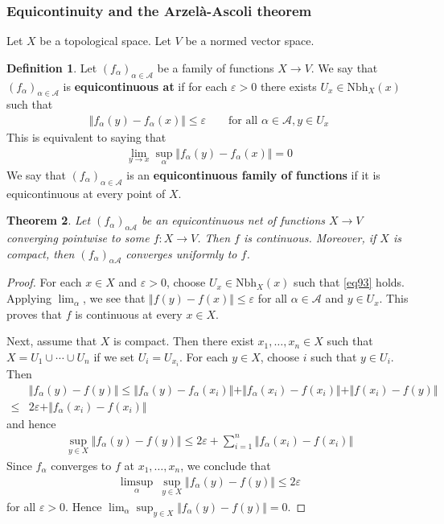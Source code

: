 \documentclass[12pt,b5paper,notitlepage]{article}
\theoremstyle{definition}
\newtheorem{df}{Definition}[section]
\theoremstyle{plain}
\newtheorem{thm}[df]{Theorem}
\newcommand{\scr}{\mathscr}
\newcommand{\Nbh}{\mathrm{Nbh}}
\newcommand{\eps}{\varepsilon}
\numberwithin{equation}{section}
\begin{document}
\subsubsection{Equicontinuity and the Arzel\`a-Ascoli theorem}

Let $X$ be a topological space. Let $V$ be a normed vector space.

\begin{df}
Let $(f_\alpha)_{\alpha\in\scr A}$ be a family of functions $X\rightarrow V$. We say that $(f_\alpha)_{\alpha\in\scr A}$ is \textbf{equicontinuous at }  if for each $\eps>0$ there exists $U_x\in\Nbh_X(x)$ such that
\begin{align}\label{eq93}
\Vert f_\alpha(y)-f_\alpha(x)\Vert\leq\eps\qquad\text{for all }\alpha\in\scr A,y\in U_x
\end{align}
This is equivalent to saying that
\begin{align*}
\lim_{y\rightarrow x}\sup_\alpha\Vert f_\alpha(y)-f_\alpha(x)\Vert=0
\end{align*}
We say that $(f_\alpha)_{\alpha\in\scr A}$ is an \textbf{equicontinuous family of functions} if it is equicontinuous at every point of $X$.
\end{df}


\begin{thm}\label{lb179}
Let $(f_\alpha)_{\alpha\scr A}$ be an equicontinuous net of functions $X\rightarrow V$ converging pointwise to some $f:X\rightarrow V$. Then $f$ is continuous. Moreover, if $X$ is compact, then $(f_\alpha)_{\alpha\scr A}$ converges uniformly to $f$.
\end{thm}

\begin{proof}
For each $x\in X$ and $\eps>0$, choose  $U_x\in\Nbh_X(x)$ such that \eqref{eq93} holds. Applying $\lim_\alpha$, we see that $\Vert f(y)-f(x)\Vert\leq\eps$ for all $\alpha\in\scr A$ and $y\in U_x$. This proves that $f$ is continuous at every $x\in X$.

Next, assume that $X$ is compact. Then there exist $x_1,\dots,x_n\in X$ such that $X=U_1\cup\cdots\cup U_n$ if we set $U_i=U_{x_i}$. For each $y\in X$, choose $i$ such that $y\in U_i$. Then
\begin{align*}
&\Vert f_\alpha(y)-f(y)\Vert\leq\Vert f_\alpha(y)-f_\alpha(x_i)\Vert+\Vert f_\alpha(x_i)-f(x_i)\Vert+\Vert f(x_i)-f(y)\Vert\\
\leq& 2\eps+\Vert f_\alpha(x_i)-f(x_i)\Vert
\end{align*}
and hence
\begin{align*}
\sup_{y\in X}\Vert f_\alpha(y)-f(y)\Vert\leq 2\eps+\sum_{i=1}^n\Vert f_\alpha(x_i)-f(x_i)\Vert
\end{align*}
Since $f_\alpha$ converges to $f$ at $x_1,\dots,x_n$, we conclude that
\begin{align*}
\limsup_\alpha ~\sup_{y\in X}\Vert f_\alpha(y)-f(y)\Vert\leq 2\eps
\end{align*}
for all $\eps>0$. Hence $\lim_\alpha\sup_{y\in X}\Vert f_\alpha(y)-f(y)\Vert=0$.
\end{proof}
\end{document}
